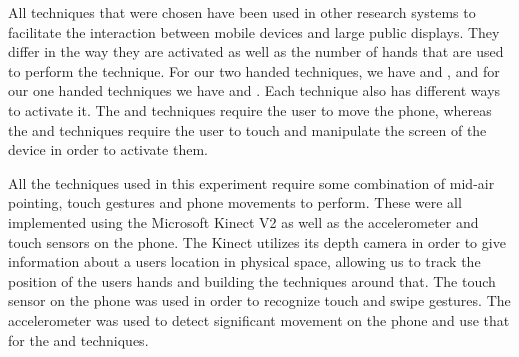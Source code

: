 All techniques that were chosen have been used in other research systems to facilitate the interaction between mobile devices and large public displays.
They differ in the way they are activated as well as the number of hands that are used to perform the technique.
For our two handed techniques, we have \throw and \grab, and for our one handed techniques we have \tilt and \swipe. 
Each technique also has different ways to activate it. 
The \throw and \tilt techniques require the user to move the phone, whereas the \swipe and \grab techniques require the user to touch and manipulate the screen of the device in order to activate them. 

All the techniques used in this experiment require some combination of mid-air pointing, touch gestures and phone movements to perform. 
These were all implemented using the Microsoft Kinect V2 as well as the accelerometer and touch sensors on the phone. 
The Kinect utilizes its depth camera in order to give information about a users location in physical space, allowing us to track the position of the users hands and building the techniques around that. 
The touch sensor on the phone was used in order to recognize touch and swipe gestures.
The accelerometer was used to detect significant movement on the phone and use that for the \tilt and \throw techniques. 